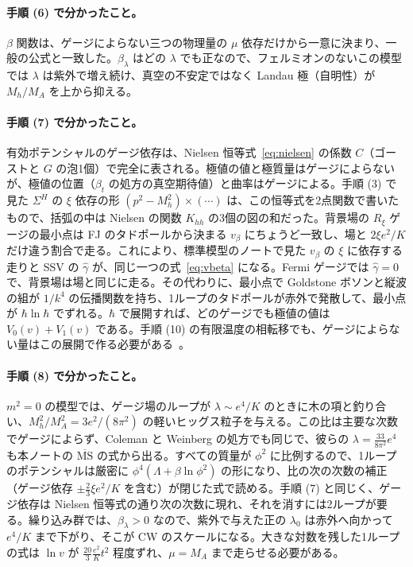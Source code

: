 \documentclass[a4paper,10pt]{ltjsarticle}
\newcommand{\MSbar}{\overline{\mathrm{MS}}}
\begin{document}
\paragraph{手順 (6) で分かったこと。}$\beta$ 関数は、ゲージによらない三つの物理量の $\mu$ 依存だけから一意に決まり、一般の公式と一致した。$\beta_\lambda$ はどの $\lambda$ でも正なので、フェルミオンのないこの模型では $\lambda$ は紫外で増え続け、真空の不安定ではなく Landau 極（自明性）が $M_h/M_A$ を上から抑える。

\paragraph{手順 (7) で分かったこと。}有効ポテンシャルのゲージ依存は、Nielsen 恒等式~\eqref{eq:nielsen} の係数 $C$（ゴーストと $G$ の泡1個）で完全に表される。極値の値と極質量はゲージによらないが、極値の位置（$\beta_t$ の処方の真空期待値）と曲率はゲージによる。手順 (3) で見た $\Sigma^H$ の $\xi$ 依存の形 $(p^2-M_h^2)\times(\cdots)$ は、この恒等式を2点関数で書いたもので、括弧の中は Nielsen の関数 $K_{hh}$ の3個の図の和だった。背景場の $R_\xi$ ゲージの最小点は FJ のタドポールから決まる $v_\beta$ にちょうど一致し、場と $2\xi e^2/K$ だけ違う割合で走る。これにより、標準模型のノートで見た $v_\beta$ の $\xi$ に依存する走りと SSV の $\hat\gamma$ が、同じ一つの式~\eqref{eq:vbeta} になる。Fermi ゲージでは $\hat\gamma=0$ で、背景場は場と同じに走る。その代わりに、最小点で Goldstone ボソンと縦波の組が $1/k^4$ の伝播関数を持ち、1ループのタドポールが赤外で発散して、最小点が $\hbar\ln\hbar$ でずれる。$\hbar$ で展開すれば、どのゲージでも極値の値は $V_0(v)+V_1(v)$ である。手順 (10) の有限温度の相転移でも、ゲージによらない量はこの展開で作る必要がある~\cite{afs15,egk16}。

\paragraph{手順 (8) で分かったこと。}$m^2=0$ の模型では、ゲージ場のループが $\lambda\sim e^4/K$ のときに木の項と釣り合い、$M_h^2/M_A^2=3e^2/(8\pi^2)$ の軽いヒッグス粒子を与える。この比は主要な次数でゲージによらず、Coleman と Weinberg の処方でも同じで、彼らの $\lambda=\frac{33}{8\pi^2}e^4$ も本ノートの $\MSbar$ の式から出る。すべての質量が $\phi^2$ に比例するので、1ループのポテンシャルは厳密に $\phi^4(\Lambda+\beta\ln\phi^2)$ の形になり、比の次の次数の補正（ゲージ依存 $\pm\frac23\xi e^2/K$ を含む）が閉じた式で読める。手順 (7) と同じく、ゲージ依存は Nielsen 恒等式の通り次の次数に現れ、それを消すには2ループが要る。繰り込み群では、$\beta_\lambda>0$ なので、紫外で与えた正の $\lambda_0$ は赤外へ向かって $e^4/K$ まで下がり、そこが CW のスケールになる。大きな対数を残した1ループの式は $\ln v$ が $\frac{20}3\frac{e^2}Kt^2$ 程度ずれ、$\mu=M_A$ まで走らせる必要がある。
\end{document}

